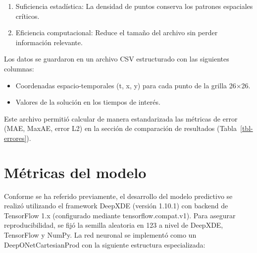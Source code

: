 \documentclass[
  spanish,
  us-letterpaper,
  DIV=11,
  numbers=noendperiod]{scrreprt}
\providecommand{\tightlist}{%
  \setlength{\itemsep}{0pt}\setlength{\parskip}{0pt}}
\theoremstyle{plain}
\theoremstyle{definition}
\theoremstyle{remark}
\begin{document}
\begin{enumerate}
\def\labelenumi{\arabic{enumi}.}
\tightlist
\item
  Suficiencia estadística: La densidad de puntos conserva los patrones
  espaciales críticos.
\item
  Eficiencia computacional: Reduce el tamaño del archivo sin perder
  información relevante.
\end{enumerate}

Los datos se guardaron en un archivo CSV estructurado con las siguientes
columnas:

\begin{itemize}
\tightlist
\item
  Coordenadas espacio-temporales (t, x, y) para cada punto de la grilla
  26×26.
\item
  Valores de la solución en los tiempos de interés.
\end{itemize}

Este archivo permitió calcular de manera estandarizada las métricas de
error (MAE, MaxAE, error L2) en la sección de comparación de resultados
(Tabla~\ref{tbl-errores}).

\chapter{Métricas del modelo}\label{muxe9tricas-del-modelo}

Conforme se ha referido previamente, el desarrollo del modelo predictivo
se realizó utilizando el framework DeepXDE (versión 1.10.1) con backend
de TensorFlow 1.x (configurado mediante tensorflow.compat.v1). Para
asegurar reproducibilidad, se fijó la semilla aleatoria en 123 a nivel
de DeepXDE, TensorFlow y NumPy. La red neuronal se implementó como un
DeepONetCartesianProd con la siguiente estructura especializada:
\end{document}
